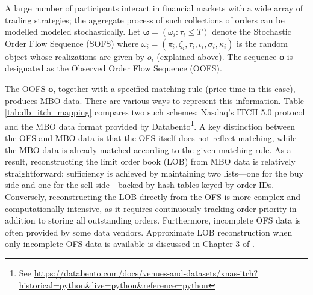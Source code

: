 \documentclass[10pt,a4paper,oneside]{article}
\providecommand{\DIFaddtex}[1]{{\protect\color{blue} \sf #1}} %
\providecommand{\DIFdeltex}[1]{{\protect\color{red} \scriptsize #1}} %
\providecommand{\DIFaddbegin}{} %
\providecommand{\DIFaddend}{} %
\providecommand{\DIFdelbegin}{} %
\providecommand{\DIFdelend}{} %
\providecommand{\DIFadd}[1]{\texorpdfstring{\DIFaddtex{#1}}{#1}} %
\providecommand{\DIFdel}[1]{\texorpdfstring{\DIFdeltex{#1}}{}} %
\newcommand{\DIFscaledelfig}{0.5}
\newlength{\DIFdelgraphicswidth} %
\newlength{\DIFdelgraphicsheight} %
\newcommand{\DIFaddincludegraphics}[2][]{{\color{blue}\fbox{\DIFOincludegraphics[#1]{#2}}}} %
\newcommand{\DIFdelincludegraphics}[2][]{%
\sbox{\DIFdelgraphicsbox}{\DIFOincludegraphics[#1]{#2}}%
\settoboxwidth{\DIFdelgraphicswidth}{\DIFdelgraphicsbox} %
\settoboxtotalheight{\DIFdelgraphicsheight}{\DIFdelgraphicsbox} %
\scalebox{\DIFscaledelfig}{%
\parbox[b]{\DIFdelgraphicswidth}{\usebox{\DIFdelgraphicsbox}\\[-\baselineskip] \rule{\DIFdelgraphicswidth}{0em}}\llap{\resizebox{\DIFdelgraphicswidth}{\DIFdelgraphicsheight}{%
\setlength{\unitlength}{\DIFdelgraphicswidth}%
\begin{picture}(1,1)%
\thicklines\linethickness{2pt} %
{\color[rgb]{1,0,0}\put(0,0){\framebox(1,1){}}}%
{\color[rgb]{1,0,0}\put(0,0){\line( 1,1){1}}}%
{\color[rgb]{1,0,0}\put(0,1){\line(1,-1){1}}}%
\end{picture}%
}\hspace*{3pt}}} %
} %
\DeclareRobustCommand{\DIFaddbegin}{\DIFOaddbegin \let\includegraphics\DIFaddincludegraphics} %
\DeclareRobustCommand{\DIFaddend}{\DIFOaddend \let\includegraphics\DIFOincludegraphics} %
\DeclareRobustCommand{\DIFdelbegin}{\DIFOdelbegin \let\includegraphics\DIFdelincludegraphics} %
\DeclareRobustCommand{\DIFdelend}{\DIFOaddend \let\includegraphics\DIFOincludegraphics} %
\begin{document}
A large number of participants interact in financial markets with a wide array of trading strategies; the aggregate process of such collections of orders can be \DIFdelbegin \DIFdel{modelled }\DIFdelend \DIFaddbegin \DIFadd{modeled }\DIFaddend stochastically. Let $\boldsymbol{\omega} = (\omega_i : \tau_i \leq T)$ denote the Stochastic Order Flow Sequence (SOFS) where $\omega_i = (\pi_i, \zeta_i, \tau_i, \iota_i, \sigma_i, \kappa_i)$ is the random object whose realizations are given by $o_i$ (explained above). The sequence $\mathbf{o}$ is designated as the Observed Order Flow Sequence (OOFS).

The OOFS $\mathbf{o}$, together with a specified matching rule (price-time in this case), produces MBO data. There are various ways to represent this information. Table \ref{tab:db_itch_mapping} compares two such schemes: Nasdaq’s ITCH 5.0 protocol \cite{nasdaq2014itch} and the MBO data format provided by Databento\footnote{See \url{https://databento.com/docs/venues-and-datasets/xnas-itch?historical=python&live=python&reference=python}}. A key distinction between the OFS and MBO data is that the OFS itself does not reflect matching, while the MBO data is already matched according to the given matching rule. As a result, reconstructing the limit order book (LOB) from MBO data is relatively straightforward; sufficiency is achieved by maintaining two lists—one for the buy side and one for the sell side—backed by hash tables keyed by order IDs. Conversely, reconstructing the LOB directly from the OFS is more complex and computationally intensive, as it requires continuously tracking order priority in addition to storing all outstanding orders. Furthermore, incomplete OFS data is often provided by some data vendors. Approximate LOB reconstruction when only incomplete OFS data is available is discussed in Chapter 3 of \cite{richards2019modelling}.
\end{document}
